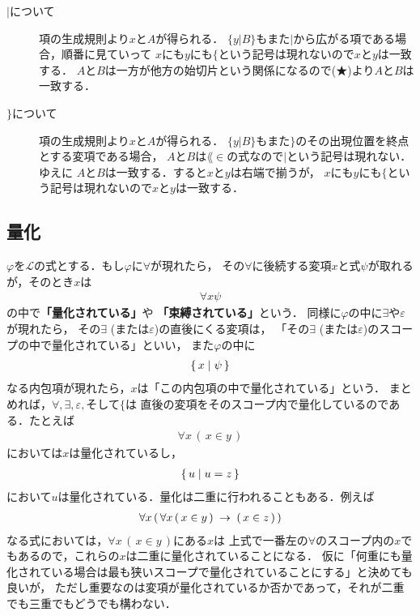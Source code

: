 \begin{description}
		\item[$|$について]
			項の生成規則より$x$と$A$が得られる．
			$\{y|B\}$もまた$|$から広がる項である場合，順番に見ていって
			$x$にも$y$にも$\{$という記号は現れないので$x$と$y$は一致する．
			$A$と$B$は一方が他方の始切片という関係になるので(★)より$A$と$B$は一致する．
			
		\item[$\}$について]
			項の生成規則より$x$と$A$が得られる．
			$\{y|B\}$もまた$\}$のその出現位置を終点とする変項である場合，
			$A$と$B$は$\lang{\in}$の式なので$|$という記号は現れない．ゆえに
			$A$と$B$は一致する．すると$x$と$y$は右端で揃うが，
			$x$にも$y$にも$\{$という記号は現れないので$x$と$y$は一致する．
	\end{description}
	
\subsection{量化}
	$\varphi$を$\mathcal{L}$の式とする．もし$\varphi$に$\forall$が現れたら，
	その$\forall$に後続する変項$x$と式$\psi$が取れるが，そのとき$x$は
	\begin{align}
		\forall x \psi
	\end{align}
	の中で{\bf 「量化されている」}や
	{\bf 「束縛されている」}という．
	同様に$\varphi$の中に$\exists$や$\varepsilon$が現れたら，
	その$\exists$ (または$\varepsilon$)の直後にくる変項は，
	「その$\exists$ (または$\varepsilon$)のスコープの中で量化されている」といい，
	また$\varphi$の中に
	\begin{align}
		\{\, x \mid \psi\, \}
	\end{align}
	なる内包項が現れたら，$x$は「この内包項の中で量化されている」という．
	まとめれば，$\forall,\exists,\varepsilon,$そして$\{$は
	直後の変項をそのスコープ内で量化しているのである．たとえば
	\begin{align}
		\forall x\, (\, x \in y\, )
	\end{align}
	においては$x$は量化されているし，
	\begin{align}
		\{\, u \mid u = z\, \}
	\end{align}
	において$u$は量化されている．量化は二重に行われることもある．例えば
	\begin{align}
		\forall x\, (\, \forall x\, (\, x \in y\, ) \hspace{0.25em}\rightarrow\hspace{0.25em} (\, x \in z\, )\, )
	\end{align}
	なる式においては，$\forall x\, (\, x \in y\, )$にある$x$は
	上式で一番左の$\forall$のスコープ内の$x$でもあるので，これらの$x$は二重に量化されていることになる．
	仮に「何重にも量化されている場合は最も狭いスコープで量化されていることにする」と決めても良いが，
	ただし重要なのは変項が量化されているか否かであって，それが二重でも三重でもどうでも構わない．
	
